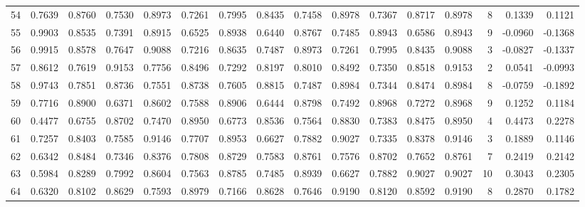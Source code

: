 \begin{tabular}{lrrrrrrrrrrrrrrr}
54  &      0.7639 &  0.8760 &  0.7530 &  0.8973 &  0.7261 &  0.7995 &  0.8435 &  0.7458 &  0.8978 &  0.7367 &   0.8717 &     0.8978 &      8 &                    0.1339 &                     0.1121 \\
55  &      0.9903 &  0.8535 &  0.7391 &  0.8915 &  0.6525 &  0.8938 &  0.6440 &  0.8767 &  0.7485 &  0.8943 &   0.6586 &     0.8943 &      9 &                   -0.0960 &                    -0.1368 \\
56  &      0.9915 &  0.8578 &  0.7647 &  0.9088 &  0.7216 &  0.8635 &  0.7487 &  0.8973 &  0.7261 &  0.7995 &   0.8435 &     0.9088 &      3 &                   -0.0827 &                    -0.1337 \\
57  &      0.8612 &  0.7619 &  0.9153 &  0.7756 &  0.8496 &  0.7292 &  0.8197 &  0.8010 &  0.8492 &  0.7350 &   0.8518 &     0.9153 &      2 &                    0.0541 &                    -0.0993 \\
58  &      0.9743 &  0.7851 &  0.8736 &  0.7551 &  0.8738 &  0.7605 &  0.8815 &  0.7487 &  0.8984 &  0.7344 &   0.8474 &     0.8984 &      8 &                   -0.0759 &                    -0.1892 \\
59  &      0.7716 &  0.8900 &  0.6371 &  0.8602 &  0.7588 &  0.8906 &  0.6444 &  0.8798 &  0.7492 &  0.8968 &   0.7272 &     0.8968 &      9 &                    0.1252 &                     0.1184 \\
60  &      0.4477 &  0.6755 &  0.8702 &  0.7470 &  0.8950 &  0.6773 &  0.8536 &  0.7564 &  0.8830 &  0.7383 &   0.8475 &     0.8950 &      4 &                    0.4473 &                     0.2278 \\
61  &      0.7257 &  0.8403 &  0.7585 &  0.9146 &  0.7707 &  0.8953 &  0.6627 &  0.7882 &  0.9027 &  0.7335 &   0.8378 &     0.9146 &      3 &                    0.1889 &                     0.1146 \\
62  &      0.6342 &  0.8484 &  0.7346 &  0.8376 &  0.7808 &  0.8729 &  0.7583 &  0.8761 &  0.7576 &  0.8702 &   0.7652 &     0.8761 &      7 &                    0.2419 &                     0.2142 \\
63  &      0.5984 &  0.8289 &  0.7992 &  0.8604 &  0.7563 &  0.8785 &  0.7485 &  0.8939 &  0.6627 &  0.7882 &   0.9027 &     0.9027 &     10 &                    0.3043 &                     0.2305 \\
64  &      0.6320 &  0.8102 &  0.8629 &  0.7593 &  0.8979 &  0.7166 &  0.8628 &  0.7646 &  0.9190 &  0.8120 &   0.8592 &     0.9190 &      8 &                    0.2870 &                     0.1782 \\

\end{tabular}
